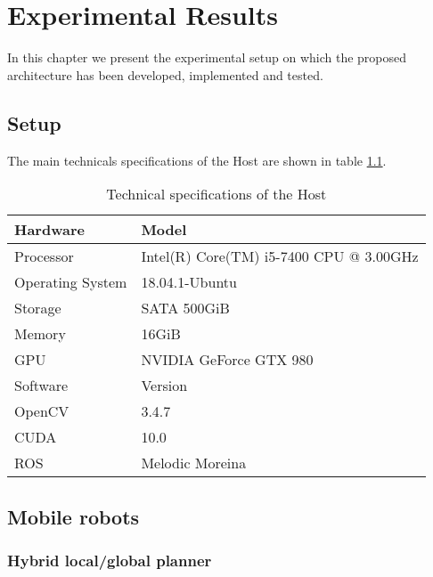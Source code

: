 \chapter{Experimental Results} \label{chap:experimental-results}
In this chapter we present the experimental setup on which the proposed architecture has been developed, implemented and tested.

\section{Setup}
The main technicals specifications of the Host are shown in table \ref{tab:tech-specs-host}.


\begin{table}[ht!]
	\centering
	\begin{tabular}{|l|l|}
		\hline
		\rowcolor{Gray}
		Hardware 			& Model 												\\
		\hline
		Processor 			& Intel(R) Core(TM) i5-7400 CPU @ 3.00GHz				\\
		Operating System 	& 18.04.1-Ubuntu										\\
		Storage 			& SATA 500GiB											\\
		Memory				& 16GiB													\\
		GPU					& NVIDIA GeForce GTX 980								\\
		\hline
		\rowcolor{Gray}
		Software 			& Version 												\\
		\hline
		OpenCV				& 3.4.7													\\
		CUDA				& 10.0													\\
		ROS					& Melodic Moreina										\\
		\hline
	\end{tabular}
	\caption{Technical specifications of the Host \label{tab:tech-specs-host}}
\end{table}

\section{Mobile robots}




\subsection{Hybrid local/global planner}



